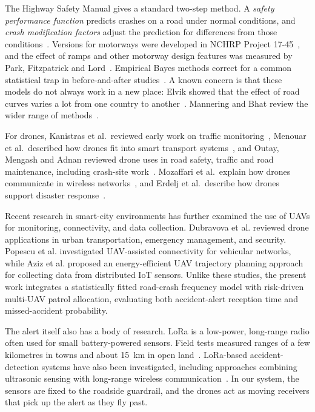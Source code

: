 \documentclass[11pt]{article}
\begin{document}
The Highway Safety Manual gives a standard two-step method. A \emph{safety
performance function} predicts crashes on a road under normal conditions, and
\emph{crash modification factors} adjust the prediction for differences from
those conditions~\cite{hsm2010}. Versions for motorways were developed in NCHRP
Project 17-45~\cite{bonneson2012}, and the effect of ramps and other motorway
design features was measured by Park, Fitzpatrick and Lord~\cite{park2010}.
Empirical Bayes methods correct for a common statistical trap in before-and-after
studies~\cite{hauer1997}. A known concern is that these models do not always
work in a new place: Elvik showed that the effect of road curves varies a lot
from one country to another~\cite{elvik2013}. Mannering and Bhat review the
wider range of methods~\cite{mannering2014}.

For drones, Kanistras et al.\ reviewed early work on traffic
monitoring~\cite{kanistras2013}, Menouar et al.\ described how drones fit into
smart transport systems~\cite{menouar2017}, and Outay, Mengash and Adnan
reviewed drone uses in road safety, traffic and road maintenance, including
crash-site work~\cite{outay2020}. Mozaffari et al.\ explain how drones
communicate in wireless networks~\cite{mozaffari2019}, and Erdelj et al.\
describe how drones support disaster response~\cite{erdelj2017}.


Recent research in smart-city environments has further examined the use of UAVs for monitoring, connectivity, and data collection. Dubravova et al. \cite{dubravova2024}
reviewed drone applications in urban transportation, emergency management, and security. Popescu et al. \cite{popescu2022} investigated UAV-assisted connectivity
for vehicular networks, while Aziz et al. \cite{aziz2026} proposed an energy-efficient UAV trajectory planning approach for collecting data from distributed IoT sensors. Unlike these studies, the present work integrates a statistically fitted road-crash frequency model with risk-driven multi-UAV patrol allocation, evaluating both accident-alert reception time and missed-accident probability.


The alert itself also has a body of research. LoRa is a low-power, long-range
radio often used for small battery-powered sensors. Field tests measured ranges
of a few kilometres in towns and about 15~km in open land~\cite{petajajarvi2015}.
LoRa-based accident-detection systems have also been investigated, including
approaches combining ultrasonic sensing with long-range wireless communication~\cite{vinodhini2025}. In our system, the sensors are
fixed to the roadside guardrail, and the drones act as moving receivers that
pick up the alert as they fly past.
\end{document}
